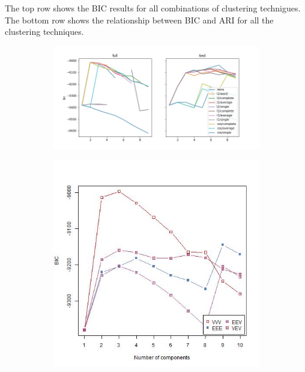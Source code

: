\documentclass{article}
\begin{document}
\noindent The top row shows the BIC results for all combinations of clustering technigues. \\
The bottom row shows the relationship between BIC and ARI for all the clustering techniques.


\newpage

\begin{figure}[h!]
\centering
\begin{subfigure}[b]{0.3\linewidth}
  \includegraphics[width=\linewidth]{python_bc_bicplot.jpg}
\end{subfigure}
\begin{subfigure}[b]{0.3\linewidth}
  \includegraphics[width=\linewidth]{r_bc_bicplot.jpg}
\end{subfigure} 


\end{figure}
\end{document}
